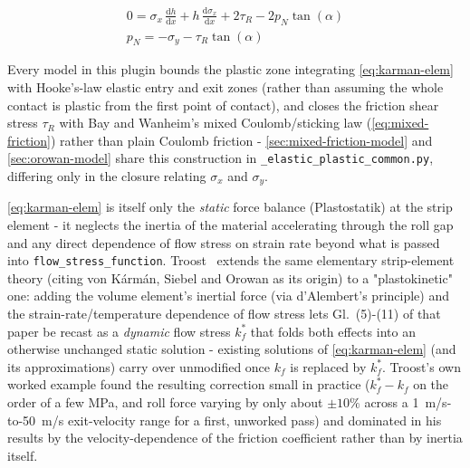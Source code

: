 \documentclass[11pt]{PyRollDocs}
\begin{document}
    \begin{gather}
        0 = \sigma_x\, \frac{\mathrm{d}h}{\mathrm{d}x} + h\, \frac{\mathrm{d}\sigma_x}{\mathrm{d}x} + 2 \tau_R - 2 p_N \tan(\alpha)\\
        p_N = -\sigma_y - \tau_R \tan(\alpha)
        \label{eq:karman-elem}
    \end{gather}

    Every model in this plugin bounds the plastic zone integrating \autoref{eq:karman-elem} with Hooke's-law elastic entry and exit zones (rather than assuming the whole contact is plastic from the first point of contact), and closes the friction shear stress $\tau_R$ with Bay and Wanheim's mixed Coulomb/sticking law (\autoref{eq:mixed-friction}) rather than plain Coulomb friction - \autoref{sec:mixed-friction-model} and \autoref{sec:orowan-model} share this construction in \lstinline{_elastic_plastic_common.py}, differing only in the closure relating $\sigma_x$ and $\sigma_y$.

    \autoref{eq:karman-elem} is itself only the \emph{static} force balance (Plastostatik) at the strip element - it neglects the inertia of the material accelerating through the roll gap and any direct dependence of flow stress on strain rate beyond what is passed into \lstinline{flow_stress_function}. Troost~\cite{Troost1967} extends the same elementary strip-element theory (citing von Kármán, Siebel and Orowan as its origin) to a "plastokinetic" one: adding the volume element's inertial force (via d'Alembert's principle) and the strain-rate/temperature dependence of flow stress lets Gl.~(5)-(11) of that paper be recast as a \emph{dynamic} flow stress $k_f^*$ that folds both effects into an otherwise unchanged static solution - existing solutions of \autoref{eq:karman-elem} (and its approximations) carry over unmodified once $k_f$ is replaced by $k_f^*$. Troost's own worked example found the resulting correction small in practice ($k_f^*-k_f$ on the order of a few MPa, and roll force varying by only about $\pm10\%$ across a \SI{1}{m/s}-to-\SI{50}{m/s} exit-velocity range for a first, unworked pass) and dominated in his results by the velocity-dependence of the friction coefficient rather than by inertia itself.
\end{document}
